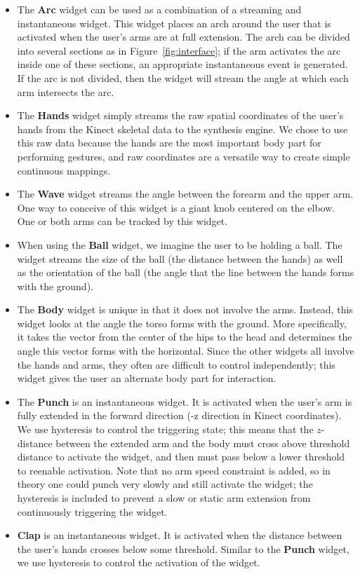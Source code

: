 \documentclass{nime-alternate}
\begin{document}
\begin{itemize}
\item The \textbf{Arc} widget can be used as a combination of a streaming and instantaneous widget.
This widget places an arch around the user that is 
activated when the user's arms are at full extension. The arch can be divided into several sections as in
Figure~\ref{fig:interface}; if the arm activates the arc inside one of these sections, an
appropriate instantaneous event is generated. If the arc is not divided, then the widget will
stream the angle at which each arm intersects the arc.
\item The \textbf{Hands} widget simply streams the raw spatial coordinates of the user's hands from the Kinect skeletal 
data to the synthesis engine. We chose to use this raw data because the hands are the
most important body part for performing gestures, and raw coordinates are a versatile way to
create simple continuous mappings.
\item The \textbf{Wave} widget streams the angle between the forearm and the upper arm. One
way to conceive of this widget is a giant knob centered on the elbow. One or both arms can
be tracked by this widget.
\item When using the \textbf{Ball} widget, we imagine the user to be holding a ball. The widget streams
the size of the ball (the distance between the hands) as well as the orientation of the ball
(the angle that the line between the hands forms with the ground).
\item The \textbf{Body} widget is unique in that it does not involve the arms. Instead, this
widget looks at the angle the torso forms with the ground. More specifically, it takes the
vector from the center of the hips to the head and determines the angle this vector forms
with the horizontal. Since the other widgets all involve the hands and arms, they often
are difficult to control independently; this widget gives the user an alternate body part for interaction.
\item The \textbf{Punch} is an instantaneous widget. It is activated when the user's arm is
fully extended in the forward direction (-z direction in Kinect coordinates). We use hysteresis to control the triggering state; this means that the $z$-distance
between the extended arm and the body must cross above threshold
distance to activate the widget, and then must pass below a lower threshold to reenable
activation. Note that no arm speed constraint is added, so in theory one could punch
very slowly and still activate the widget; the hysteresis is included to prevent a slow or 
static arm extension from continuously triggering the widget.
\item \textbf{Clap} is an instantaneous widget. It is activated when the distance
between the user's hands crosses below some threshold. Similar to the \textbf{Punch} widget,
we use hysteresis to control the activation of the widget.
\end{itemize}
\end{document}
